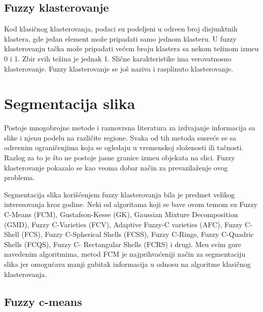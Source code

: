 \documentclass{article}
\begin{document}
\subsection{\selectfont Fuzzy \selectfont klasterovanje}

Kod klasi\v{c}nog klasterovanja, podaci su podeljeni u odre\dj en broj disjunktnih klastera, gde jedan element mo\v{z}e pripadati samo jednom klasteru. U {\selectfont fuzzy} klasterovanju ta\v{c}ka mo\v{z}e pripadati ve\'{c}em broju klastera sa nekom te\v{z}inom izme\dj u 0 i 1. Zbir svih te\v{z}ina je jednak 1. Sli\v{c}ne karakteristike ima verovatnosno klasterovanje. {\selectfont Fuzzy} klasterovanje se jo\v{s} naziva i rasplinuto klasterovanje.


\section{\selectfont Segmentacija slika}

Postoje mnogobrojne metode i raznovrsna literatura za izdvajanje informacija sa slike i njenu podelu na razli\v{c}ite regione. Svaka od tih metoda susre\'{c}e se sa odre\dj enim ograni\v{c}enjima koja se ogledaju u vremenskoj slo\v{z}enosti ili ta\v{c}nosti. Razlog za to je \v{s}to ne postoje jasne granice izme\dj u objekata na slici. {\selectfont Fuzzy} klasterovanje pokazalo se kao veoma dobar na\v{c}in za prevazila\v{z}enje ovog problema.

Segmentacija slika kori\v{s}\'{c}enjem {\selectfont fuzzy} klasterovanja bila je predmet velikog interesovanja kroz godine. Neki od algoritama koji se bave ovom temom su {\selectfont Fuzzy C-Means (FCM), Gustafson-Kesse (GK), Gaussian Mixture Decomposition (GMD), Fuzzy C-Varieties (FCV), Adaptive Fuzzy-C varieties (AFC), Fuzzy C-Shell (FCS), Fuzzy C-Spherical Shells (FCSS), Fuzzy C-Rings, Fuzzy C-Quadric Shells (FCQS), Fuzzy C- Rectangular Shells (FCRS)} i drugi. Me\dj u svim gore navedenim algoritmima, metod {\selectfont FCM}
je najprihva\'{c}eniji na\v{c}in za segmentaciju slika jer omogu\'{c}ava manji gubitak informacija u odnosu na algoritme klasi\v{c}nog klasterovanja. 


\subsection{\selectfont Fuzzy c-means}
\end{document}
